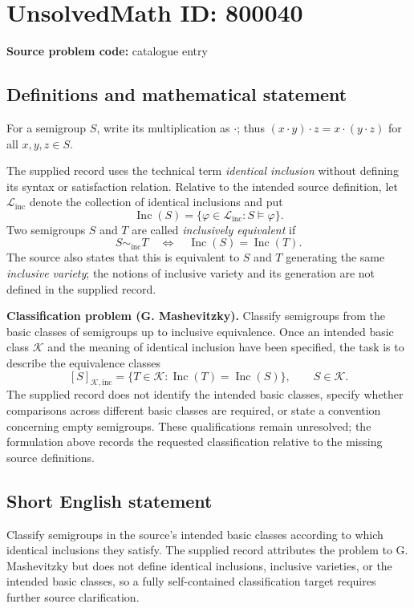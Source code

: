 \documentclass[11pt]{article}
\begin{document}
\section*{UnsolvedMath ID: 800040}
\textbf{Source problem code:} catalogue entry
\subsection{Definitions and mathematical statement}
For a semigroup \(S\), write its multiplication as \(\cdot\); thus \((x\cdot y)\cdot z=x\cdot(y\cdot z)\) for all \(x,y,z\in S\).

The supplied record uses the technical term \emph{identical inclusion} without defining its syntax or satisfaction relation. Relative to the intended source definition, let \(\mathcal L_{\mathrm{inc}}\) denote the collection of identical inclusions and put
\[
\operatorname{Inc}(S)=\{\varphi\in\mathcal L_{\mathrm{inc}}:S\models\varphi\}.
\]
Two semigroups \(S\) and \(T\) are called \emph{inclusively equivalent} if
\[
S\sim_{\mathrm{inc}}T
\quad\Longleftrightarrow\quad
\operatorname{Inc}(S)=\operatorname{Inc}(T).
\]
The source also states that this is equivalent to \(S\) and \(T\) generating the same \emph{inclusive variety}; the notions of inclusive variety and its generation are not defined in the supplied record.

\textbf{Classification problem (G. Mashevitzky).} Classify semigroups from the basic classes of semigroups up to inclusive equivalence. Once an intended basic class \(\mathcal K\) and the meaning of identical inclusion have been specified, the task is to describe the equivalence classes
\[
[S]_{\mathcal K,\mathrm{inc}}
=\{T\in\mathcal K:\operatorname{Inc}(T)=\operatorname{Inc}(S)\},
\qquad S\in\mathcal K.
\]
The supplied record does not identify the intended basic classes, specify whether comparisons across different basic classes are required, or state a convention concerning empty semigroups. These qualifications remain unresolved; the formulation above records the requested classification relative to the missing source definitions.
\subsection{Short English statement}
Classify semigroups in the source's intended basic classes according to which identical inclusions they satisfy. The supplied record attributes the problem to G. Mashevitzky but does not define identical inclusions, inclusive varieties, or the intended basic classes, so a fully self-contained classification target requires further source clarification.
\end{document}

